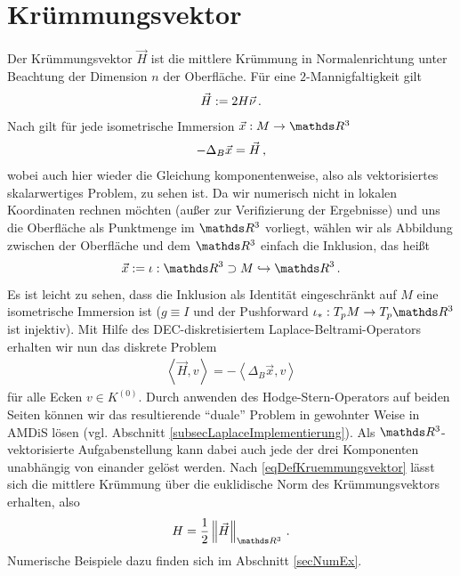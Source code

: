 \section{Krümmungsvektor}
  \label{secKruemmungsvektor}
  Der Krümmungsvektor \( \vec{H} \) ist die mittlere Krümmung in Normalenrichtung unter Beachtung der Dimension \( n \) der Oberfläche.
  Für eine \( 2 \)-Mannigfaltigkeit gilt
  \begin{align}
    \label{eqDefKruemmungsvektor}
    \vec{H} := 2 H \vec{\nu} \,\text{.}
  \end{align}
  Nach \cite[Kap.4.5]{chen} gilt für jede isometrische Immersion \( \vec{x}:M\rightarrow \R^{3} \)
  \begin{align}
    -\Delta_{B}\vec{x} = \vec{H} \,\text{,}
  \end{align}
  wobei auch hier wieder die Gleichung komponentenweise, also als vektorisiertes skalarwertiges Problem, zu sehen ist.
  Da wir numerisch nicht in lokalen Koordinaten rechnen möchten (außer zur Verifizierung der Ergebnisse) und uns die Oberfläche als
  Punktmenge im \( \R^{3} \) vorliegt, wählen wir als Abbildung zwischen der Oberfläche und dem \( \R^{3} \) einfach die Inklusion, das heißt
  \begin{align}
    \vec{x}:= \iota: \R^{3}\supset M \hookrightarrow \R^{3} \formpunkt
  \end{align}
  Es ist leicht zu sehen, dass die Inklusion als Identität eingeschränkt auf \( M \) eine isometrische Immersion ist 
  (\( g\equiv I \) und der Pushforward \( \iota_{*}:T_{p}M \rightarrow T_{p}\R^{3} \) ist injektiv).
  Mit Hilfe des DEC-diskretisiertem Laplace-Beltrami-Operators erhalten wir nun das diskrete Problem
  \begin{align}
    \label{eqProbLX}
    \left\langle \vec{H}, v \right\rangle = - \left\langle \Delta_{B}\vec{x} , v \right\rangle
  \end{align}
  für alle Ecken \( v\in K^{(0)} \).
  Durch anwenden des Hodge-Stern-Operators auf beiden Seiten können wir das resultierende "`duale"' Problem in gewohnter Weise in AMDiS
  lösen (vgl. Abschnitt \ref{subsecLaplaceImplementierung}).
  Als \( \R^{3} \)-vektorisierte Aufgabenstellung kann dabei auch jede der drei Komponenten unabhängig von einander gelöst werden.
  Nach \eqref{eqDefKruemmungsvektor} lässt sich die mittlere Krümmung über die euklidische Norm des Krümmungsvektors erhalten, also
  \begin{align}
    H = \frac{1}{2}\left\| \vec{H} \right\|_{\R^{3}} \formpunkt
  \end{align}
  Numerische Beispiele dazu finden sich im Abschnitt \ref{secNumEx}.

